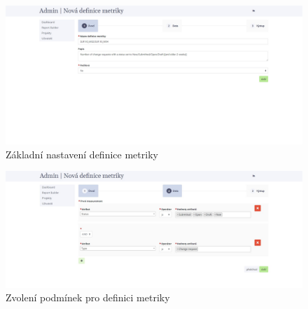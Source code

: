 \documentclass[czech,master]{diploma}
\begin{document}
\begin{figure}[!ht]
    \centering
    \includegraphics[width=1\textwidth]{Diplomka/Figures/metrics_tool/admin_report_builder_first.jpg}
    \caption{Základní nastavení definice metriky}
    \label{fig:admin_report_builder_first_first}
\end{figure}

\begin{figure}[!ht]
    \centering
    \includegraphics[width=1\textwidth]{Diplomka/Figures/metrics_tool/admin_report_builder_second.jpg}
    \caption{Zvolení podmínek pro definici metriky}
    \label{fig:admin_report_builder_second}
\end{figure}
\end{document}
